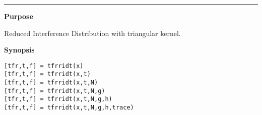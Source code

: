 

\hspace*{-1.6cm}{\Large \bf tfrridt}

\vspace*{-.4cm}
\hspace*{-1.6cm}\rule[0in]{16.5cm}{.02cm}
\vspace*{.2cm}

{\bf \large {}\selectfont Purpose}\\
\hspace*{1.5cm}
\begin{minipage}[t]{13.5cm}
Reduced Interference Distribution with triangular kernel.
\end{minipage}
\vspace*{.5cm}

{\bf \large {}\selectfont Synopsis}\\
\hspace*{1.5cm}
\begin{minipage}[t]{13.5cm}
\begin{verbatim}
[tfr,t,f] = tfrridt(x)
[tfr,t,f] = tfrridt(x,t)
[tfr,t,f] = tfrridt(x,t,N)
[tfr,t,f] = tfrridt(x,t,N,g)
[tfr,t,f] = tfrridt(x,t,N,g,h)
[tfr,t,f] = tfrridt(x,t,N,g,h,trace)
\end{verbatim}
\end{minipage}
\vspace*{.5cm}

